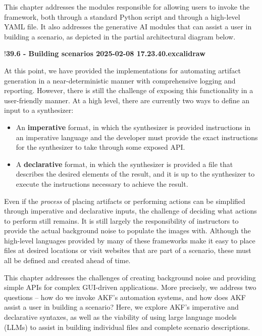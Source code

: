 This chapter addresses the modules responsible for allowing users to
invoke the framework, both through a standard Python script and through
a high-level YAML file. It also addresses the generative AI modules that
can assist a user in building a scenario, as depicted in the partial
architectural diagram below.

!\textbf{39.6 - Building scenarios 2025-02-08 17.23.40.excalidraw}

At this point, we have provided the implementations for automating
artifact generation in a near-deterministic manner with comprehensive
logging and reporting. However, there is still the challenge of exposing
this functionality in a user-friendly manner. At a high level, there are
currently two ways to define an input to a synthesizer:

\begin{itemize}
\tightlist
\item
  An \textbf{imperative} format, in which the synthesizer is provided
  instructions in an imperative language and the developer must provide
  the exact instructions for the synthesizer to take through some
  exposed API.
\item
  A \textbf{declarative} format, in which the synthesizer is provided a
  file that describes the desired elements of the result, and it is up
  to the synthesizer to execute the instructions necessary to achieve
  the result.
\end{itemize}

Even if the \emph{process} of placing artifacts or performing actions
can be simplified through imperative and declarative inputs, the
challenge of deciding what actions to perform still remains. It is still
largely the responsibility of instructors to provide the actual
background noise to populate the images with. Although the high-level
languages provided by many of these frameworks make it easy to place
files at desired locations or visit websites that are part of a
scenario, these must all be defined and created ahead of time.

This chapter addresses the challenges of creating background noise and
providing simple APIs for complex GUI-driven applications. More
precisely, we address two questions -- how do we invoke AKF's automation
systems, and how does AKF assist a user in building a scenario? Here, we
explore AKF's imperative and declarative syntaxes, as well as the
viability of using large language models (LLMs) to assist in building
individual files and complete scenario descriptions.

